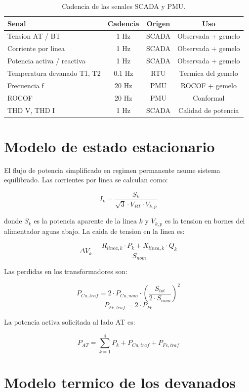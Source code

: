 \begin{table}[ht]
\centering
\small
\caption{Cadencia de las senales SCADA y PMU.}
\label{tab:cadencia}
\begin{tabular}{lccc}
\toprule
\textbf{Senal} & \textbf{Cadencia} & \textbf{Origen} & \textbf{Uso} \\
\midrule
Tension AT / BT    & 1 Hz   & SCADA & Observada + gemelo \\
Corriente por linea & 1 Hz   & SCADA & Observada + gemelo \\
Potencia activa / reactiva & 1 Hz & SCADA & Observada + gemelo \\
Temperatura devanado T1, T2 & 0.1 Hz & RTU & Termica del gemelo \\
Frecuencia f & 20 Hz & PMU & ROCOF + gemelo \\
ROCOF & 20 Hz & PMU & Conformal \\
THD V, THD I & 1 Hz & SCADA & Calidad de potencia \\
\bottomrule
\end{tabular}
\end{table}

\section{Modelo de estado estacionario}

El flujo de potencia simplificado en regimen permanente asume
sistema equilibrado. Las corrientes por linea se calculan como:

\[
I_k = \frac{S_k}{\sqrt{3} \cdot V_{BT} \cdot V_{k,p}}
\]

donde $S_k$ es la potencia aparente de la linea $k$ y $V_{k,p}$ es
la tension en bornes del alimentador aguas abajo. La caida de
tension en la linea es:

\[
\Delta V_k = \frac{R_{linea,k} \cdot P_k + X_{linea,k} \cdot Q_k}{S_{nom}}
\]

Las perdidas en los transformadores son:

\[
P_{Cu,traf} = 2 \cdot P_{Cu,nom} \cdot \left(\frac{S_{tot}}{2 \cdot S_{nom}}\right)^2
\]
\[
P_{Fe,traf} = 2 \cdot P_{Fe}
\]

La potencia activa solicitada al lado AT es:

\[
P_{AT} = \sum_{k=1}^{4} P_k + P_{Cu,traf} + P_{Fe,traf}
\]

\section{Modelo termico de los devanados}

